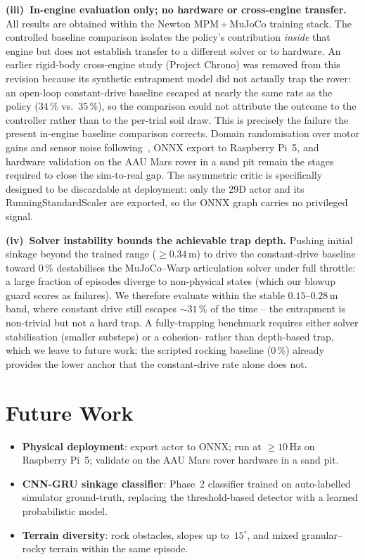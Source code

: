 \documentclass[conference]{IEEEtran}
\begin{document}
\textbf{(iii)~In-engine evaluation only; no hardware or cross-engine transfer.}
All results are obtained within the Newton MPM\,+\,MuJoCo training stack. The
controlled baseline comparison isolates the policy's contribution \emph{inside}
that engine but does not establish transfer to a different solver or to
hardware. An earlier rigid-body cross-engine study (Project Chrono) was removed
from this revision because its synthetic entrapment model did not actually trap
the rover: an open-loop constant-drive baseline escaped at nearly the same rate
as the policy ($34\,\%$ vs.\ $35\,\%$), so the comparison could not attribute
the outcome to the controller rather than to the per-trial soil draw. This is
precisely the failure the present in-engine baseline comparison corrects.
Domain randomisation over motor gains and sensor noise
following~\cite{tobin2017domainrand,andrychowicz2020learning}, ONNX export to
Raspberry Pi~5, and hardware validation on the AAU Mars rover in a sand pit
remain the stages required to close the sim-to-real gap. The asymmetric critic is
specifically designed to be discardable at deployment: only the 29D actor and
its RunningStandardScaler are exported, so the ONNX graph carries no
privileged signal.

\textbf{(iv)~Solver instability bounds the achievable trap depth.}
Pushing initial sinkage beyond the trained range ($\geq 0.34$\,m) to drive the
constant-drive baseline toward $0\,\%$ destabilises the MuJoCo--Warp
articulation solver under full throttle: a large fraction of episodes diverge to
non-physical states (which our blowup guard scores as failures). We therefore
evaluate within the stable $0.15$--$0.28$\,m band, where constant drive still
escapes ${\sim}31\,\%$ of the time -- the entrapment is non-trivial but not a
hard trap. A fully-trapping benchmark requires either solver stabilisation
(smaller substeps) or a cohesion- rather than depth-based trap, which we leave to
future work; the scripted rocking baseline ($0\,\%$) already provides the lower
anchor that the constant-drive rate alone does not.

\section{Future Work}
\label{sec:future}

\begin{itemize}
  \item \textbf{Physical deployment}: export actor to ONNX; run at ${\geq}10$\,Hz
        on Raspberry Pi~5; validate on the AAU Mars rover hardware in a sand pit.
  \item \textbf{CNN-GRU sinkage classifier}: Phase~2 classifier trained on
        auto-labelled simulator ground-truth, replacing the threshold-based
        detector with a learned probabilistic model.
  \item \textbf{Terrain diversity}: rock obstacles, slopes up to~$15^\circ$, and
        mixed granular--rocky terrain within the same episode.
\end{itemize}
\end{document}
